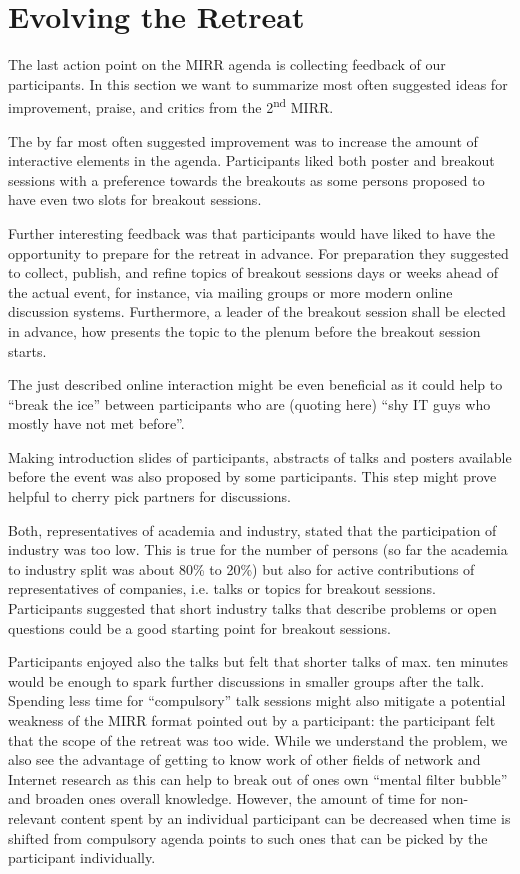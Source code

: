 \section{Evolving the Retreat}\label{sec:evolution}

The last action point on the MIRR agenda is collecting feedback of our participants. In this section we want to summarize most often suggested ideas for improvement, praise, and critics from the 2\textsuperscript{nd} MIRR.

The by far most often suggested improvement was to increase the amount of interactive elements in the agenda. Participants liked both poster and breakout sessions with a preference towards the breakouts as some persons proposed to have even two slots for breakout sessions.

Further interesting feedback was that participants would have liked to have the opportunity to prepare for the retreat in advance. For preparation they suggested to collect, publish, and refine topics of breakout sessions days or weeks ahead of the actual event, for instance, via mailing groups or more modern online discussion systems. Furthermore, a leader of the breakout session shall be elected in advance, how presents the topic to the plenum before the breakout session starts.

The just described online interaction might be even beneficial as it could help to ``break the ice'' between participants who are (quoting here) ``shy IT guys who mostly have not met before''.

Making introduction slides of participants, abstracts of talks and posters available before the event was also proposed by some participants. This step might prove helpful to cherry pick partners for discussions.

Both, representatives of academia and industry, stated that the participation of industry was too low. This is true for the number of persons (so far the academia to industry split was about 80\% to 20\%) but also for active contributions of representatives of companies, i.e. talks or topics for breakout sessions. Participants suggested that short industry talks that describe problems or open questions could be a good starting point for breakout sessions.

Participants enjoyed also the talks but felt that shorter talks of max. ten minutes would be enough to spark further discussions in smaller groups after the talk. Spending less time for ``compulsory'' talk sessions might also mitigate a potential weakness of the MIRR format pointed out by a participant: the participant felt that the scope of the retreat was too wide. While we understand the problem, we also see the advantage of getting to know work of other fields of network and Internet research as this can help to break out of ones own ``mental filter bubble'' and broaden ones overall knowledge. However, the amount of time for non-relevant content spent by an individual participant can be decreased when time is shifted from compulsory agenda points to such ones that can be picked by the participant individually.

